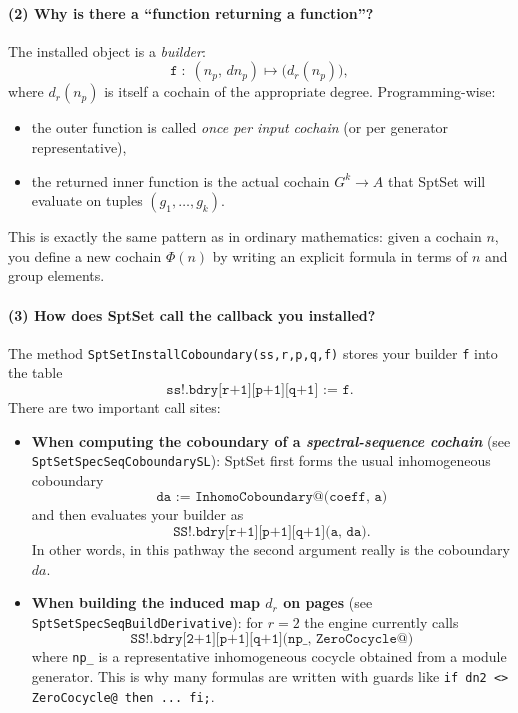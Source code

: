 \documentclass{SciPost}
\begin{document}
\paragraph{(2) Why is there a ``function returning a function''?}
The installed object is a \emph{builder}:
\begin{equation}
	\texttt{f}\;:\; (n_p,\, dn_p)\longmapsto \bigl(d_r(n_p)\bigr),
\end{equation}
where $d_r(n_p)$ is itself a cochain of the appropriate degree.
Programming-wise:
\begin{itemize}
    \item the outer function is called \emph{once per input cochain} (or per generator representative),
    \item the returned inner function is the actual cochain $G^{k}\to A$ that SptSet will evaluate on tuples $(g_1,\dots,g_k)$.
\end{itemize}
This is exactly the same pattern as in ordinary mathematics: given a cochain $n$, you define a new cochain $\Phi(n)$ by writing an explicit formula in terms of $n$ and group elements.

\paragraph{(3) How does SptSet call the callback you installed?}
The method \texttt{SptSetInstallCoboundary(ss,r,p,q,f)} stores your builder \texttt{f} into the table
\begin{equation}
	\texttt{ss!.bdry[r+1][p+1][q+1] := f.}
\end{equation}
There are two important call sites:
\begin{itemize}
    \item \textbf{When computing the coboundary of a \emph{spectral-sequence cochain}} (see \texttt{SptSetSpecSeqCoboundarySL}):
    SptSet first forms the usual inhomogeneous coboundary
    \begin{equation}
    	\texttt{da := InhomoCoboundary@(coeff, a)}
    \end{equation}
    and then evaluates your builder as
    \begin{equation}
    	\texttt{SS!.bdry[r+1][p+1][q+1](a, da)}.
    \end{equation}
    In other words, in this pathway the second argument really is the coboundary $da$.

    \item \textbf{When building the induced map $d_r$ on pages} (see \texttt{SptSetSpecSeqBuildDerivative}):
    for $r=2$ the engine currently calls
    \begin{equation}
    	\texttt{SS!.bdry[2+1][p+1][q+1](np\_, ZeroCocycle@)}
    \end{equation}
    where \texttt{np\_} is a representative inhomogeneous cocycle obtained from a module generator.
    This is why many formulas are written with guards like \texttt{if dn2 <> ZeroCocycle@ then ... fi;}.
\end{itemize}
\end{document}
